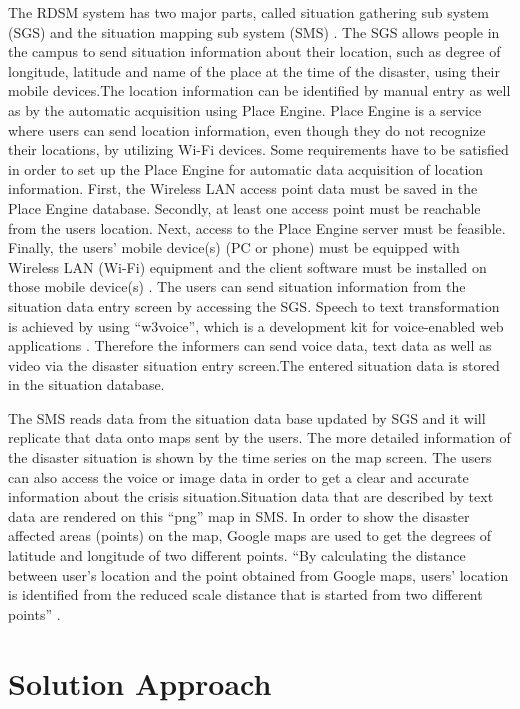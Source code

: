 The RDSM system has two major parts, called situation gathering sub system (SGS) and the situation mapping sub system (SMS) \cite{springlink}. The SGS allows people in the campus to send situation information about their location, such as degree of longitude, latitude and name of the place at the time of the disaster, using their mobile devices.The location information can be identified by manual entry as well as by the automatic acquisition using Place Engine. Place Engine is a service where users can send location information, even though they do not recognize their locations, by utilizing Wi-Fi devices. Some requirements have to be satisfied in order to set up the Place Engine for automatic data acquisition of location information. First, the Wireless LAN access point data must be saved in the Place Engine database. Secondly, at least one access point must be reachable from the users  location. Next, access to the Place Engine server must be feasible. Finally, the users’ mobile device(s) (PC or phone) must be equipped with Wireless LAN (Wi-Fi) equipment and the client software must be installed on those mobile device(s) \cite{springlink}. The users can send situation information from the situation data entry screen by accessing the SGS. Speech to text transformation is achieved by using “w3voice”, which is a development kit for voice-enabled web applications \cite{springlink}. Therefore the informers can send voice data, text data as well as video via the disaster situation entry screen.The entered situation data is stored in the situation database. 

The SMS reads data from the situation data base updated by SGS and it will replicate that data onto maps sent by the users. The more detailed information of the disaster situation is shown by the time series on the map screen. The users can also access the voice or image data  in order to get a clear and accurate information about the crisis situation.Situation data that are described by text data are rendered on this “png” map in SMS. In order to show the disaster affected areas (points) on the map, Google maps are used to get the degrees of latitude and longitude of two different points. “By calculating the distance between user’s location and the point obtained from Google maps, users’ location is identified from the reduced scale distance that is started from two different points” \cite{springlink}.

\section{Solution Approach}

